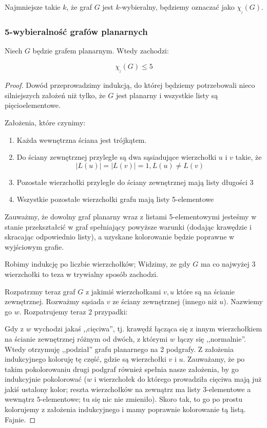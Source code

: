 Najmniejsze takie \(k\), że graf \(G\) jest \(k\)-wybieralny, będziemy oznaczać jako \(\chi_{_l}(G)\).

\subsubsection{5-wybieralność grafów planarnych}
Niech \(G\) będzie grafem planarnym. Wtedy zachodzi:
\begin{theorem}{
		\begin{equation}
			\chi_{_l}(G) \leq 5
		\end{equation}
	}
\end{theorem}

\begin{proof}
	Dowód przeprowadzimy indukcją, do której będziemy potrzebowali nieco silniejszych założeń niż tylko, że \(G\) jest planarny i wszystkie listy są pięcioelementowe.

	Założenia, które czynimy:
	\begin{enumerate}
		\item Każda wewnętrzna ściana jest trójkątem.
		\item Do ściany zewnętrznej przyległe są dwa sąsiadujące wierzchołki \(u\) i \(v\) takie, że
		      \[ |L(u)| = |L(v)| = 1, L(u) \neq L(v) \]
		\item Pozostałe wierzchołki przyległe do ściany zewnętrznej mają listy długości 3
		\item Wszystkie pozostałe wierzchołki grafu mają listy 5-elementowe
	\end{enumerate}

	Zauważmy, że dowolny graf planarny wraz z listami 5-elementowymi jesteśmy w stanie przekształcić w graf spełniający powyższe warunki (dodając krawędzie i skracając odpowiednio listy), a uzyskane kolorowanie będzie poprawne w wyjściowym grafie.

	Robimy indukcję po liczbie wierzchołków; Widzimy, ze gdy \(G\) ma co najwyżej 3 wierzchołki to teza w trywialny sposób zachodzi.

	Rozpatrzmy teraz graf \(G\) z jakimiś wierzchołkami \(v, u\) które są na ścianie zewnętrznej. Rozważmy sąsiada \(v\) ze ściany zewnętrznej (innego niż \(u\)). Nazwiemy go \(w\). Rozpatrujemy teraz 2 przypadki:

	Gdy z \(w\) wychodzi jakaś ,,cięciwa'', tj. krawędź łącząca się z innym wierzchołkiem na ścianie zewnętrznej różnym od dwóch, z którymi \(w\) łączy się ,,normalnie''. Wtedy otrzymuję ,,podział'' grafu planarnego na 2 podgrafy. Z założenia indukcyjnego koloruję tę część, gdzie są wierzchołki \(v\) i \(u\). Zauważamy, że po takim pokolorowaniu drugi podgraf również spełnia nasze założenia, by go indukcyjnie pokolorować (\(w\) i wierzchołek do którego prowadziła cięciwa mają już jakiś ustalony kolor; reszta wierzchołków na zewnątrz ma listy \(3\)-elementowe a wewnątrz \(5\)-elementowe; tu się nic nie zmieniło). Skoro tak, to go po prostu kolorujemy z założenia indukcyjnego i mamy poprawnie kolorowanie tą listą. Fajnie.


\end{proof}
